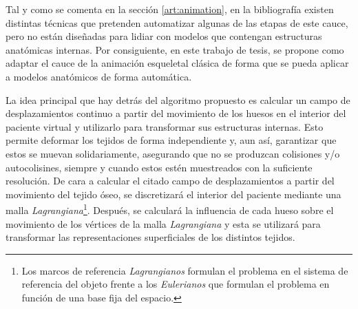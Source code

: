 Tal y como se comenta en la sección \ref{art:animation}, en la bibliografía existen distintas técnicas que pretenden automatizar algunas de las etapas de este cauce, pero no están diseñadas para lidiar con modelos que contengan estructuras anatómicas internas. Por consiguiente, en este trabajo de tesis, se propone como adaptar el cauce de la animación esqueletal clásica de forma que se pueda aplicar a modelos anatómicos de forma automática. 

La idea principal que hay detrás del algoritmo propuesto es calcular un campo de desplazamientos continuo a partir del movimiento de los huesos
en el interior del paciente virtual y utilizarlo para transformar sus estructuras internas. Esto permite deformar los tejidos de forma independiente y, aun así, garantizar que estos se muevan solidariamente, asegurando que no se produzcan colisiones y/o autocolisines, siempre y cuando estos estén muestreados con la suficiente resolución. 
%
De cara a calcular el citado campo de desplazamientos a partir del movimiento del tejido óseo, se discretizará el interior del paciente mediante una malla \emph{Lagrangiana}\footnote{Los marcos de referencia \emph{Lagrangianos} formulan el problema en el sistema de referencia del objeto frente a los \emph{Eulerianos} que formulan el problema en función de una base fija del espacio.}. Después, se calculará la influencia de cada hueso sobre el movimiento de los vértices de la malla \emph{Lagrangiana} y esta se utilizará para transformar las representaciones superficiales de los distintos tejidos. 

